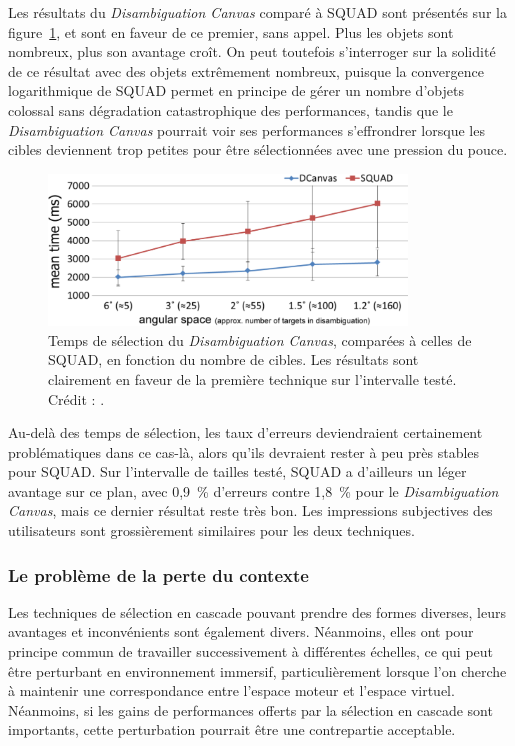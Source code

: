 	Les résultats du \emph{Disambiguation Canvas} comparé à SQUAD sont présentés sur la figure~\ref{fig:dCanvasSPerf}, et sont en faveur de ce premier, sans appel. Plus les objets sont nombreux, plus son avantage croît. On peut toutefois s'interroger sur la solidité de ce résultat avec des objets extrêmement nombreux, puisque la convergence logarithmique de SQUAD permet en principe de gérer un nombre d'objets colossal sans dégradation catastrophique des performances, tandis que le \emph{Disambiguation Canvas} pourrait voir ses performances s'effrondrer lorsque les cibles deviennent trop petites pour être sélectionnées avec une pression du pouce.	
	
	\begin{figure}[!htb]
		\centering
		\includegraphics[width=0.85\textwidth]{figures/ch2/dCanvasSPerf}
		\caption[\emph{Disambiguation Canvas} -- performances II]{Temps de sélection du \emph{Disambiguation Canvas}, comparées à celles de SQUAD, en fonction du nombre de cibles. Les résultats sont clairement en faveur de la première technique sur l'intervalle testé. Crédit : \cite{debarba2013disambiguation}.}
		\label{fig:dCanvasSPerf}
	\end{figure}
	
	Au-delà des temps de sélection, les taux d'erreurs deviendraient certainement problématiques dans ce cas-là, alors qu'ils devraient rester à peu près stables pour SQUAD. Sur l'intervalle de tailles testé, SQUAD a d'ailleurs un léger avantage sur ce plan, avec 0,9~\%{} d'erreurs contre 1,8~\%{} pour le \emph{Disambiguation Canvas}, mais ce dernier résultat reste très bon. Les impressions subjectives des utilisateurs sont grossièrement similaires pour les deux techniques.
		 
	\subsubsection{Le problème de la perte du contexte}
	Les techniques de sélection en cascade pouvant prendre des formes diverses, leurs avantages et inconvénients sont également divers. Néanmoins, elles ont pour principe commun de travailler successivement à différentes échelles, ce qui peut être perturbant en environnement immersif, particulièrement lorsque l'on cherche à maintenir une correspondance entre l'espace moteur et l'espace virtuel. Néanmoins, si les gains de performances offerts par la sélection en cascade sont importants, cette perturbation pourrait être une contrepartie acceptable.
	
